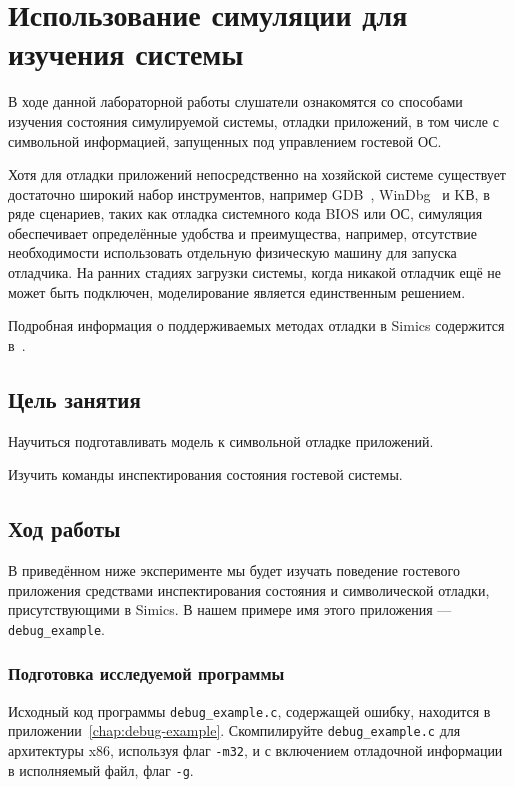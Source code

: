 \chapter{Использование симуляции для изучения системы}\label{chap:lab04}

В ходе данной лабораторной работы слушатели ознакомятся со способами изучения состояния симулируемой системы, отладки приложений, в том числе с символьной информацией, запущенных под управлением гостевой ОС.

Хотя для отладки приложений непосредственно на хозяйской системе существует достаточно широкий набор инструментов, например GDB~\cite{gdb}, WinDbg~\cite{windbg} и KВ, в ряде сценариев, таких как отладка системного кода BIOS или ОС, симуляция обеспечивает определённые удобства и преимущества, например, отсутствие необходимости использовать отдельную физическую машину для запуска отладчика. На ранних стадиях загрузки системы, когда никакой отладчик ещё не может быть подключен, моделирование является единственным решением.

Подробная информация о поддерживаемых методах отладки в Simics содержится в~\cite{analyzer, hindsight}.

\section{Цель занятия}

\begin{itemize*}
    \item Научиться подготавливать модель к символьной отладке приложений.
    \item Изучить команды инспектирования состояния гостевой системы.
\end{itemize*}

\section{Ход работы}

В приведённом ниже эксперименте мы будет изучать поведение гостевого приложения средствами инспектирования состояния и символической отладки, присутствующими в Simics. В нашем примере имя этого приложения --- \texttt{debug_example}.

\subsection{Подготовка исследуемой программы}

Исходный код программы \texttt{debug_example.c}, содержащей ошибку, находится в приложении~\ref{chap:debug-example}. Скомпилируйте \texttt{debug_example.c} для архитектуры x86, используя флаг \texttt{-m32}, и с включением отладочной информации в исполняемый файл, флаг \texttt{-g}.


